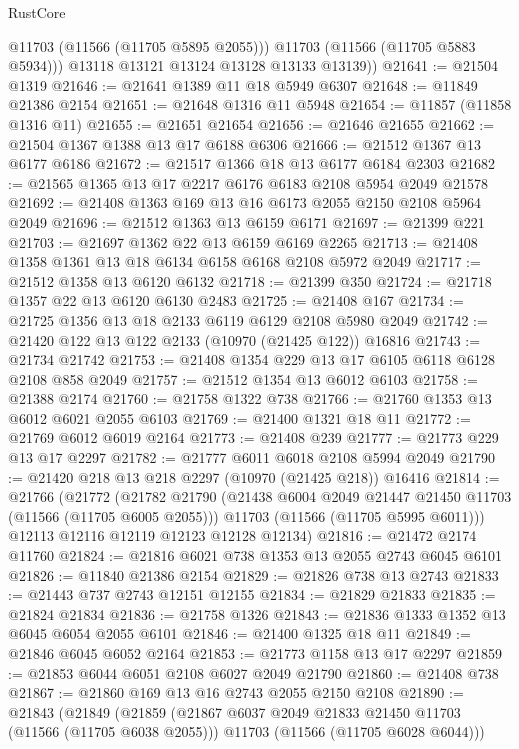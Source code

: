 \begin{lexlean}{RustCore}
\begin{coremodule}
            @11703
            (@11566 (@11705 @5895 @2055)))
          @11703
          (@11566 (@11705 @5883 @5934)))
        @13118
        @13121
        @13124
        @13128
        @13133
        @13139))
@21641 := @21504 @1319
@21646 := @21641 @1389 @11 @18 @5949 @6307
@21648 := @11849 @21386 @2154
@21651 := @21648 @1316 @11 @5948
@21654 := @11857 (@11858 @1316 @11)
@21655 := @21651 @21654
@21656 := @21646 @21655
@21662 := @21504 @1367 @1388 @13 @17 @6188 @6306
@21666 := @21512 @1367 @13 @6177 @6186
@21672 := @21517 @1366 @18 @13 @6177 @6184 @2303
@21682 := @21565 @1365 @13 @17 @2217 @6176 @6183 @2108 @5954 @2049 @21578
@21692 := @21408 @1363 @169 @13 @16 @6173 @2055 @2150 @2108 @5964 @2049
@21696 := @21512 @1363 @13 @6159 @6171
@21697 := @21399 @221
@21703 := @21697 @1362 @22 @13 @6159 @6169 @2265
@21713 := @21408 @1358 @1361 @13 @18 @6134 @6158 @6168 @2108 @5972 @2049
@21717 := @21512 @1358 @13 @6120 @6132
@21718 := @21399 @350
@21724 := @21718 @1357 @22 @13 @6120 @6130 @2483
@21725 := @21408 @167
@21734 := @21725 @1356 @13 @18 @2133 @6119 @6129 @2108 @5980 @2049
@21742 := @21420 @122 @13 @122 @2133 (@10970 (@21425 @122)) @16816
@21743 := @21734 @21742
@21753 := @21408 @1354 @229 @13 @17 @6105 @6118 @6128 @2108 @858 @2049
@21757 := @21512 @1354 @13 @6012 @6103
@21758 := @21388 @2174
@21760 := @21758 @1322 @738
@21766 := @21760 @1353 @13 @6012 @6021 @2055 @6103
@21769 := @21400 @1321 @18 @11
@21772 := @21769 @6012 @6019 @2164
@21773 := @21408 @239
@21777 := @21773 @229 @13 @17 @2297
@21782 := @21777 @6011 @6018 @2108 @5994 @2049
@21790 := @21420 @218 @13 @218 @2297 (@10970 (@21425 @218)) @16416
@21814 := @21766
    (@21772
      (@21782
        @21790
        (@21438 @6004 @2049 @21447 @21450 @11703 (@11566 (@11705 @6005 @2055)))
        @11703
        (@11566 (@11705 @5995 @6011)))
      @12113
      @12116
      @12119
      @12123
      @12128
      @12134)
@21816 := @21472 @2174 @11760
@21824 := @21816 @6021 @738 @1353 @13 @2055 @2743 @6045 @6101
@21826 := @11840 @21386 @2154
@21829 := @21826 @738 @13 @2743
@21833 := @21443 @737 @2743 @12151 @12155
@21834 := @21829 @21833
@21835 := @21824 @21834
@21836 := @21758 @1326
@21843 := @21836 @1333 @1352 @13 @6045 @6054 @2055 @6101
@21846 := @21400 @1325 @18 @11
@21849 := @21846 @6045 @6052 @2164
@21853 := @21773 @1158 @13 @17 @2297
@21859 := @21853 @6044 @6051 @2108 @6027 @2049 @21790
@21860 := @21408 @738
@21867 := @21860 @169 @13 @16 @2743 @2055 @2150 @2108
@21890 := @21843
    (@21849
      (@21859
        (@21867 @6037 @2049 @21833 @21450 @11703 (@11566 (@11705 @6038 @2055)))
        @11703
        (@11566 (@11705 @6028 @6044)))

\end{coremodule}
\end{lexlean}
